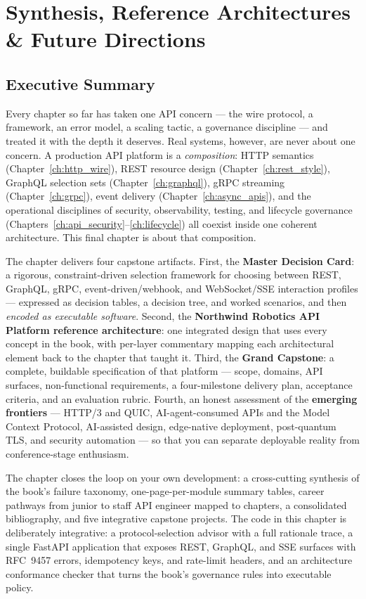 \chapter{Synthesis, Reference Architectures \& Future Directions}
\label{ch:synthesis}

\section*{Executive Summary}

Every chapter so far has taken one API concern --- the wire protocol, a
framework, an error model, a scaling tactic, a governance discipline --- and
treated it with the depth it deserves. Real systems, however, are never about
one concern. A production API platform is a \emph{composition}: HTTP semantics
(Chapter~\ref{ch:http_wire}), REST resource design
(Chapter~\ref{ch:rest_style}), GraphQL selection sets
(Chapter~\ref{ch:graphql}), gRPC streaming (Chapter~\ref{ch:grpc}), event
delivery (Chapter~\ref{ch:async_apis}), and the operational disciplines of
security, observability, testing, and lifecycle governance
(Chapters~\ref{ch:api_security}--\ref{ch:lifecycle}) all coexist inside one
coherent architecture. This final chapter is about that composition.

The chapter delivers four capstone artifacts. First, the \textbf{Master
Decision Card}: a rigorous, constraint-driven selection framework for choosing
between REST, GraphQL, gRPC, event-driven/webhook, and WebSocket/SSE
interaction profiles --- expressed as decision tables, a decision tree, and
worked scenarios, and then \emph{encoded as executable software}. Second, the
\textbf{Northwind Robotics API Platform reference architecture}: one
integrated design that uses every concept in the book, with per-layer
commentary mapping each architectural element back to the chapter that taught
it. Third, the \textbf{Grand Capstone}: a complete, buildable specification of
that platform --- scope, domains, API surfaces, non-functional requirements, a
four-milestone delivery plan, acceptance criteria, and an evaluation rubric.
Fourth, an honest assessment of the \textbf{emerging frontiers} --- HTTP/3 and
QUIC, AI-agent-consumed APIs and the Model Context Protocol, AI-assisted
design, edge-native deployment, post-quantum TLS, and security automation ---
so that you can separate deployable reality from conference-stage enthusiasm.

The chapter closes the loop on your own development: a cross-cutting
synthesis of the book's failure taxonomy, one-page-per-module summary tables,
career pathways from junior to staff API engineer mapped to chapters, a
consolidated bibliography, and five integrative capstone projects. The code in
this chapter is deliberately integrative: a protocol-selection advisor with a
full rationale trace, a single FastAPI application that exposes REST, GraphQL,
and SSE surfaces with RFC~9457 errors, idempotency keys, and rate-limit
headers, and an architecture conformance checker that turns the book's
governance rules into executable policy.

